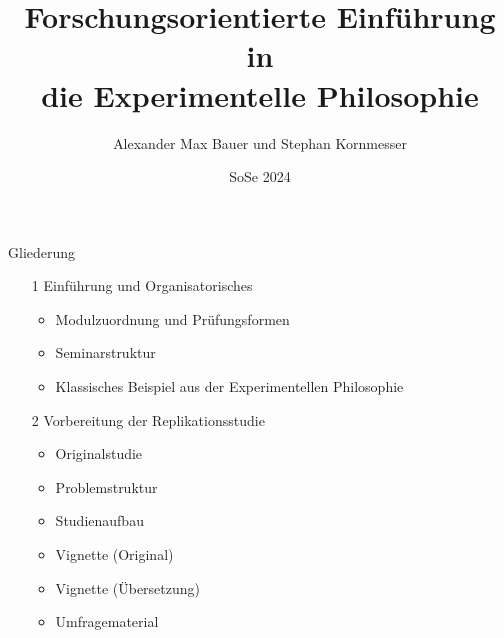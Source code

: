 \documentclass[xcolor=table,9pt,aspectratio=169]{beamer}
\title{Forschungsorientierte Einführung in \\die Experimentelle Philosophie}
\subtitle{}
\author{Alexander Max Bauer und Stephan Kornmesser}
\date{SoSe 2024}
\begin{document}
{
\begin{frame}
   \maketitle
\end{frame}
}

\begin{frame}{\vspace*{10mm}Gliederung}
\begin{itemize}
   \item[1] Einführung und Organisatorisches
   \begin{itemize}
      \item Modulzuordnung und Prüfungsformen
      \item Seminarstruktur
      \item Klassisches Beispiel aus der Experimentellen Philosophie
   \end{itemize}
   \item[2] Vorbereitung der Replikationsstudie
   \begin{itemize}
      \item Originalstudie
      \item Problemstruktur
      \item Studienaufbau
      \item Vignette (Original)
      \item Vignette (Übersetzung)
      \item Umfragematerial
   \end{itemize}
\end{itemize}
\end{frame}
\end{document}

